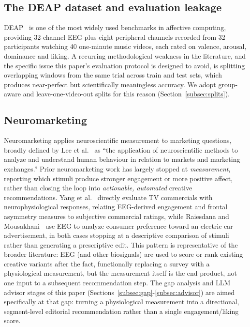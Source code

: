 \documentclass[conference]{IEEEtran}
\begin{document}
\subsection{The DEAP dataset and evaluation leakage}
DEAP~\cite{koelstra2012deap} is one of the most widely used benchmarks in
affective computing, providing 32-channel EEG plus eight peripheral
channels recorded from 32 participants watching 40 one-minute music
videos, each rated on valence, arousal, dominance and liking. A
recurring methodological weakness in the literature, and the specific
issue this paper's evaluation protocol is designed to avoid, is
splitting overlapping windows from the same trial across train and test
sets, which produces near-perfect but scientifically meaningless accuracy.
We adopt group-aware and leave-one-video-out splits for this reason
(Section~\ref{subsec:splits}).

\subsection{Neuromarketing}
Neuromarketing applies neuroscientific measurement to marketing questions,
broadly defined by Lee et al.~\cite{lee2007neuromarketing} as ``the
application of neuroscientific methods to analyze and understand human
behaviour in relation to markets and marketing exchanges.'' Prior
neuromarketing work has largely stopped at \emph{measurement},
reporting which stimuli produce stronger engagement or more positive
affect, rather than closing the loop into \emph{actionable, automated}
creative recommendations. Yang et al.~\cite{yang2015tvcommercials}
directly evaluate TV commercials with neurophysiological responses,
relating EEG-derived engagement and frontal asymmetry measures to
subjective commercial ratings, while Raiesdana and
Mousakhani~\cite{raiesdana2022eegcar} use EEG to analyze consumer
preference toward an electric car advertisement, in both cases stopping
at a descriptive comparison of stimuli rather than generating a
prescriptive edit. This pattern is representative of the broader
literature: EEG (and other biosignals) are used to score or rank
existing creative variants after the fact, functionally replacing a
survey with a physiological measurement, but the measurement itself is
the end product, not one input to a subsequent recommendation step. The
gap analysis and LLM advisor stages of this paper
(Sections~\ref{subsec:gap}-\ref{subsec:advisor}) are aimed specifically
at that gap: turning a physiological measurement into a directional,
segment-level editorial recommendation rather than a single
engagement/liking score.
\end{document}
